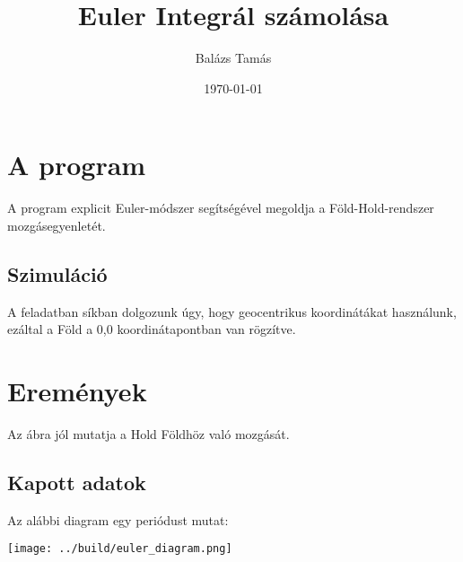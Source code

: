 \documentclass[twoside]{article}
\title{Euler Integrál számolása}
\date{\today}
\author{Balázs Tamás}
\begin{document}
	
	\maketitle
	\section*{A program}
		A program explicit Euler-módszer segítségével megoldja a Föld-Hold-rendszer mozgásegyenletét.
		\subsection*{Szimuláció}
		A feladatban síkban dolgozunk úgy, hogy geocentrikus koordinátákat használunk, ezáltal a Föld a 0,0 koordinátapontban van rögzítve.
		
	\section*{Eremények}
		\par Az ábra jól mutatja a Hold Földhöz való mozgását.
		\subsection*{Kapott adatok}	
		\par Az alábbi diagram egy periódust mutat:
		\begin{center}
			\texttt{[image: ../build/euler\_diagram.png]}
		\end{center}
\end{document}
